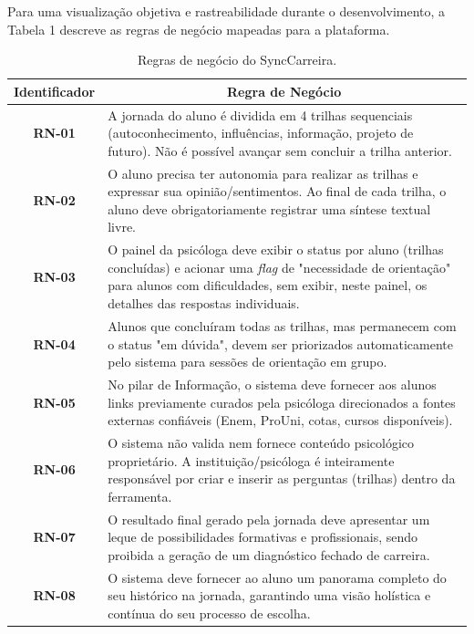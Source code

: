 Para uma visualização objetiva e rastreabilidade durante o desenvolvimento, a Tabela 1 descreve as regras de negócio mapeadas para a plataforma.

\begin{table}[htb]
    \centering
    \ABNTEXfontereduzida
    \caption[Regras de Negócio do SyncCarreira]{Regras de negócio do SyncCarreira.}
    \label{tab-regras-negocio}
    \begin{tabular}{|c|p{12cm}|}
    \hline
    \textbf{Identificador} & \multicolumn{1}{c|}{\textbf{Regra de Negócio}} \\
    \hline
    \textbf{RN-01} & A jornada do aluno é dividida em 4 trilhas sequenciais (autoconhecimento, influências, informação, projeto de futuro). Não é possível avançar sem concluir a trilha anterior. \\
    \hline
    \textbf{RN-02} & O aluno precisa ter autonomia para realizar as trilhas e expressar sua opinião/sentimentos. Ao final de cada trilha, o aluno deve obrigatoriamente registrar uma síntese textual livre. \\
    \hline
    \textbf{RN-03} & O painel da psicóloga deve exibir o status por aluno (trilhas concluídas) e acionar uma \textit{flag} de "necessidade de orientação" para alunos com dificuldades, sem exibir, neste painel, os detalhes das respostas individuais. \\
    \hline
    \textbf{RN-04} & Alunos que concluíram todas as trilhas, mas permanecem com o status "em dúvida", devem ser priorizados automaticamente pelo sistema para sessões de orientação em grupo. \\
    \hline
    \textbf{RN-05} & No pilar de Informação, o sistema deve fornecer aos alunos links previamente curados pela psicóloga direcionados a fontes externas confiáveis (Enem, ProUni, cotas, cursos disponíveis). \\
    \hline
    \textbf{RN-06} & O sistema não valida nem fornece conteúdo psicológico proprietário. A instituição/psicóloga é inteiramente responsável por criar e inserir as perguntas (trilhas) dentro da ferramenta. \\
    \hline
    \textbf{RN-07} & O resultado final gerado pela jornada deve apresentar um leque de possibilidades formativas e profissionais, sendo proibida a geração de um diagnóstico fechado de carreira. \\
    \hline
    \textbf{RN-08} & O sistema deve fornecer ao aluno um panorama completo do seu histórico na jornada, garantindo uma visão holística e contínua do seu processo de escolha. \\
    \hline
    \end{tabular}
    \end{table}

